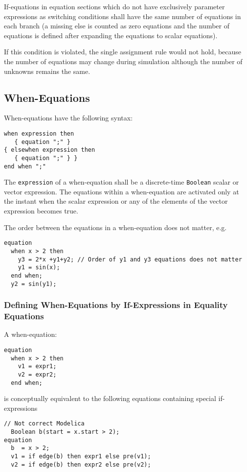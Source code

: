 If-equations in equation sections which do not have exclusively
parameter expressions as switching conditions shall have the same number
of equations in each branch (a missing else is counted as zero equations
and the number of equations is defined after expanding the equations to
scalar equations).

\begin{nonnormative}
If this condition is violated, the single assignment rule would not hold, because the number of equations may change during simulation
although the number of unknowns remains the same.
\end{nonnormative}

\subsection{When-Equations}\label{when-equations}

When-equations have the following syntax:
\begin{lstlisting}[language=grammar]
when expression then
   { equation ";" }
{ elsewhen expression then
   { equation ";" } }
end when ";"
\end{lstlisting}

The \lstinline!expression! of a when-equation shall be a discrete-time \lstinline!Boolean! scalar or vector expression.
The equations within a when-equation are activated only at the instant when the scalar expression or any of the elements of the vector expression becomes true.

\begin{example}
The order between the equations in a when-equation does not matter, e.g.
\begin{lstlisting}[language=modelica]
equation
  when x > 2 then
    y3 = 2*x +y1+y2; // Order of y1 and y3 equations does not matter
    y1 = sin(x);
  end when;
  y2 = sin(y1);
\end{lstlisting}
\end{example}

\subsubsection{Defining When-Equations by If-Expressions in Equality Equations}\label{defining-when-equations-by-if-expressions-in-equality-equations}

A when-equation:
\begin{lstlisting}[language=modelica]
equation
  when x > 2 then
    v1 = expr1;
    v2 = expr2;
  end when;
\end{lstlisting}
is conceptually equivalent to the following equations containing special if-expressions
\begin{lstlisting}[language=modelica]
  // Not correct Modelica
  Boolean b(start = x.start > 2);
equation
  b  = x > 2;
  v1 = if edge(b) then expr1 else pre(v1);
  v2 = if edge(b) then expr2 else pre(v2);
\end{lstlisting}

